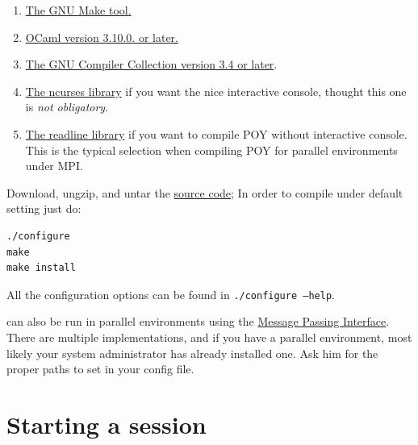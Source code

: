 \begin{enumerate}
    \item \href{http://www.gnu.org/software/make/}{The GNU Make tool.}
    \item \href{http://www.ocaml.org}{OCaml version 3.10.0. or later.}
    \item \href{http://gcc.gnu.org/}{The GNU Compiler Collection version 3.4 or
        later}.
    \item \href{http://www.gnu.org/software/ncurses/}{The ncurses library} if
        you want the nice interactive console, thought this one is
        \emph{not obligatory}.
    \item \href{http://tiswww.case.edu/php/chet/readline/rltop.html}{The
        readline library} if you want
        to compile POY without interactive console. This is the typical
        selection when compiling POY for parallel environments under MPI.
\end{enumerate}

Download, ungzip, and untar the
\href{http://research.amnh.org/scicomp/projects/poy.php}{\poy source code};
In order to compile under default setting just do:
\begin{verbatim}
./configure
make
make install
\end{verbatim}
All the configuration options can be found in {\tt ./configure --help}.

\poy can also be run in parallel environments using the
\href{http://www-unix.mcs.anl.gov/mpi/}{Message Passing Interface}. There are
multiple implementations, and if you have a parallel environment, most likely
your system administrator has already installed one. Ask him for the proper
paths to set in your config file.

\section{Starting a \poy session}

